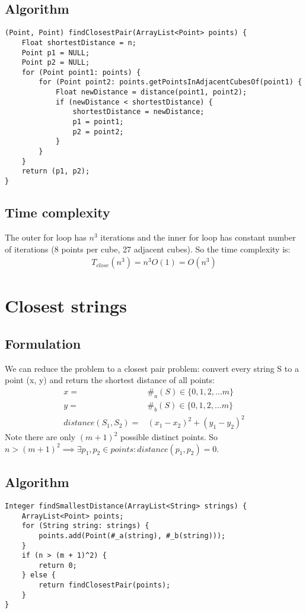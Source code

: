 \documentclass{article}
\begin{document}
\subsection{Algorithm}
\begin{lstlisting}
(Point, Point) findClosestPair(ArrayList<Point> points) {
	Float shortestDistance = n;
	Point p1 = NULL;
	Point p2 = NULL;
	for (Point point1: points) {
		for (Point point2: points.getPointsInAdjacentCubesOf(point1) {
			Float newDistance = distance(point1, point2);
			if (newDistance < shortestDistance) {
				shortestDistance = newDistance;
				p1 = point1;
				p2 = point2;
			}
		}
	}
	return (p1, p2);
}
\end{lstlisting}
\subsection{Time complexity}
The outer for loop has $n^3$ iterations and the inner for loop has constant
number of iterations (8 points per cube, 27 adjacent cubes). So the time
complexity is:
\begin{align*}
T_{close}(n^3) = n^3 O(1) = O(n^3)
\end{align*}

\section{Closest strings}
\subsection{Formulation}
We can reduce the problem to a closest pair problem: convert every string S to a
point (x, y) and return the shortest distance of all points:
\begin{align*}
x =& \#_a(S) \in \{0, 1, 2, \ldots m\}\\
y =& \#_b(S) \in \{0, 1, 2, \ldots m\}\\
distance(S_1, S_2) =& (x_1-x_2)^2 + (y_1-y_2)^2
\end{align*}
Note there are only $(m + 1)^2$ possible distinct points. So $n > (m + 1)^2
\implies \exists p_1, p_2 \in points: distance(p_1, p_2) = 0$.
\subsection{Algorithm}
\begin{lstlisting}
Integer findSmallestDistance(ArrayList<String> strings) {
	ArrayList<Point> points;
	for (String string: strings) {
		points.add(Point(#_a(string), #_b(string)));
	}
	if (n > (m + 1)^2) {
		return 0;
	} else {
		return findClosestPair(points);
	}
}
\end{lstlisting}
\end{document}
